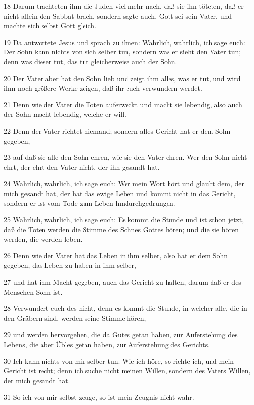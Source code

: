 \par 18 Darum trachteten ihm die Juden viel mehr nach, daß sie ihn töteten, daß er nicht allein den Sabbat brach, sondern sagte auch, Gott sei sein Vater, und machte sich selbst Gott gleich.
\par 19 Da antwortete Jesus und sprach zu ihnen: Wahrlich, wahrlich, ich sage euch: Der Sohn kann nichts von sich selber tun, sondern was er sieht den Vater tun; denn was dieser tut, das tut gleicherweise auch der Sohn.
\par 20 Der Vater aber hat den Sohn lieb und zeigt ihm alles, was er tut, und wird ihm noch größere Werke zeigen, daß ihr euch verwundern werdet.
\par 21 Denn wie der Vater die Toten auferweckt und macht sie lebendig, also auch der Sohn macht lebendig, welche er will.
\par 22 Denn der Vater richtet niemand; sondern alles Gericht hat er dem Sohn gegeben,
\par 23 auf daß sie alle den Sohn ehren, wie sie den Vater ehren. Wer den Sohn nicht ehrt, der ehrt den Vater nicht, der ihn gesandt hat.
\par 24 Wahrlich, wahrlich, ich sage euch: Wer mein Wort hört und glaubt dem, der mich gesandt hat, der hat das ewige Leben und kommt nicht in das Gericht, sondern er ist vom Tode zum Leben hindurchgedrungen.
\par 25 Wahrlich, wahrlich, ich sage euch: Es kommt die Stunde und ist schon jetzt, daß die Toten werden die Stimme des Sohnes Gottes hören; und die sie hören werden, die werden leben.
\par 26 Denn wie der Vater hat das Leben in ihm selber, also hat er dem Sohn gegeben, das Leben zu haben in ihm selber,
\par 27 und hat ihm Macht gegeben, auch das Gericht zu halten, darum daß er des Menschen Sohn ist.
\par 28 Verwundert euch des nicht, denn es kommt die Stunde, in welcher alle, die in den Gräbern sind, werden seine Stimme hören,
\par 29 und werden hervorgehen, die da Gutes getan haben, zur Auferstehung des Lebens, die aber Übles getan haben, zur Auferstehung des Gerichts.
\par 30 Ich kann nichts von mir selber tun. Wie ich höre, so richte ich, und mein Gericht ist recht; denn ich suche nicht meinen Willen, sondern des Vaters Willen, der mich gesandt hat.
\par 31 So ich von mir selbst zeuge, so ist mein Zeugnis nicht wahr.
